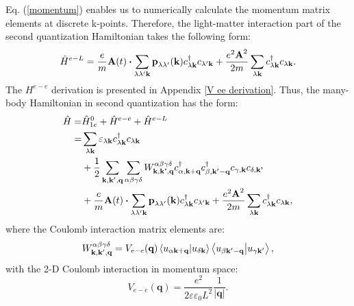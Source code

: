 \documentclass[12pt,english,a4paper]{article}
\newcommand{\dg}{\dagger}
\begin{document}
\quad Eq. (\ref{momentum}) enables us to numerically calculate the momentum matrix elements at discrete k-points. Therefore, the light-matter interaction part of the second quantization Hamiltonian takes the following form:
	\begin{equation}
\hat{H}^{e-L} = \frac{e}{m}\textbf{A}(t)\vdot\sum_{\lambda\lambda' \textbf{k}}\textbf{p}_{\lambda \lambda'}(\textbf{k})c^\dg_{\lambda\textbf{k}}c_{\lambda' \textbf{k}} +\frac{e^2 \textbf{A}^2}{2m}\sum_{\lambda \textbf{k}} c^\dg_{\lambda \textbf{k}} c_{\lambda\textbf{k}}.
	\end{equation}
\quad The $H^{e-e}$ derivation is presented in Appendix \ref{V ee derivation}. Thus, the many-body  Hamiltonian in second quantization has the form:
		\begin{align}
		\label{H with Coulomb in second}
		\hat{H} =& \hat{H}^0_{1e} +\hat{H}^{e-e} + \hat{H}^{e-L} \nonumber \\
		=&  \sum_{\lambda\textbf{k}} \varepsilon_{\lambda\textbf{k}} c_{\lambda\textbf{k}}^\dg c_{\lambda\textbf{k}} \nonumber \\ 
		&+ \frac{1}{2} \sum_{\textbf{k}, \textbf{k}', \textbf{q}} \sum_{\alpha \beta \gamma \delta} W^{\alpha \beta \gamma \delta}_{\textbf{k},\textbf{k'},\textbf{q}} c_{\alpha, \textbf{k}+\textbf{q}}^\dg c_{\beta, \textbf{k}' - \textbf{q}}^\dg c_{\gamma, \textbf{k}}c_{\delta, \textbf{k'}} \nonumber \\
		&+ \frac{e}{m}\textbf{A}(t)\vdot\sum_{\lambda\lambda' \textbf{k}}\textbf{p}_{\lambda \lambda'}(\textbf{k})c^\dg_{\lambda\textbf{k}}c_{\lambda' \textbf{k}} + \frac{e^2 \textbf{A}^2}{2m}\sum_{\lambda \textbf{k}} c^\dg_{\lambda \textbf{k}} c_{\lambda\textbf{k}},
	\end{align}
\quad where the Coulomb interaction matrix elements are:
	\begin{equation}
		W^{\alpha \beta \gamma \delta}_{\textbf{k}, \textbf{k}',\textbf{q}} = V_{e-e}(\textbf{q}) \braket{u_{\alpha\textbf{k} +\textbf{q}}}{u_{\delta\textbf{k}}} \braket{u_{\beta\textbf{k}' -\textbf{q}}}{u_{\gamma \textbf{k}'}},
	\end{equation}
\quad with the 2-D Coulomb interaction in momentum space:
	\begin{equation}
		\label{2D coulomb}
		V_{e-e}(\textbf{q}) = \frac{e^2}{2\varepsilon\varepsilon_0 L^2} \frac{1}{|\textbf{q}|}.
	\end{equation}
\end{document}
